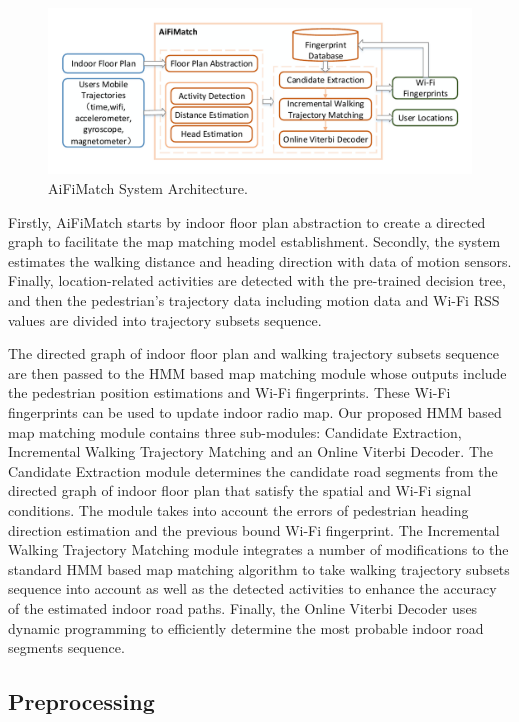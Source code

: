 \documentclass{llncs}
\begin{document}
\vspace{-10pt}
\begin{figure}[!htbp]
	\centering
	\includegraphics[width=4.7in]{AiFiMatch-Architecture}
	\caption{AiFiMatch System Architecture.}
	\label{fig-architecture}
\end{figure}
\vspace{-10pt}

Firstly, AiFiMatch starts by indoor floor plan abstraction to create a directed graph to facilitate the map matching model establishment. Secondly, the system estimates the walking distance and heading direction with data of motion sensors. Finally, location-related activities are detected with the pre-trained decision tree, and then the pedestrian's trajectory data including motion data and Wi-Fi RSS values are divided into trajectory subsets sequence.  

The directed graph of indoor floor plan and walking trajectory subsets sequence are then passed to the HMM based map matching module whose outputs include the pedestrian position estimations and Wi-Fi fingerprints. These Wi-Fi fingerprints can be used to update indoor radio map. Our proposed HMM based map matching module contains three sub-modules: Candidate Extraction, Incremental Walking Trajectory Matching and an Online Viterbi Decoder. The Candidate Extraction module determines the candidate road segments from the directed graph of indoor floor plan that satisfy the spatial and Wi-Fi signal conditions. The module takes into account the errors of pedestrian heading direction estimation and the previous bound Wi-Fi fingerprint. The Incremental Walking Trajectory Matching module integrates a number of modifications to the standard HMM based map matching algorithm to take walking trajectory subsets sequence into account as well as the detected activities to enhance the accuracy of the estimated indoor road paths. Finally, the Online Viterbi Decoder uses dynamic programming to efficiently determine the most probable indoor road segments sequence.

\subsection{Preprocessing}
\end{document}
